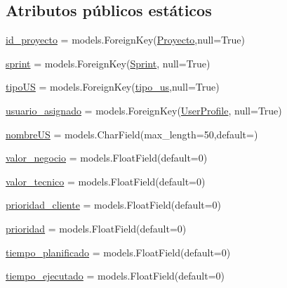 \subsection*{Atributos públicos estáticos}
\begin{DoxyCompactItemize}
\item 
\hyperlink{classuser_story_1_1models_1_1_user_stories_a129b6e2463b6ce9ec3ca204c408303e8}{id\+\_\+proyecto} = models.\+Foreign\+Key(\hyperlink{classproyectos_1_1models_1_1_proyecto}{Proyecto},null=True)
\item 
\hyperlink{classuser_story_1_1models_1_1_user_stories_ab0c43b69bb58a9813846b1ea586a0789}{sprint} = models.\+Foreign\+Key(\hyperlink{class_sprints_1_1models_1_1_sprint}{Sprint}, null=True)
\item 
\hyperlink{classuser_story_1_1models_1_1_user_stories_aef9db53ba498c5fd769c0c6bde3f1b54}{tipo\+US} = models.\+Foreign\+Key(\hyperlink{classtipo_u_s_1_1models_1_1tipo__us}{tipo\+\_\+us},null=True)
\item 
\hyperlink{classuser_story_1_1models_1_1_user_stories_a0ee6ed978e6d77c2b8fb929088734cd5}{usuario\+\_\+asignado} = models.\+Foreign\+Key(\hyperlink{classusuario_1_1models_1_1_user_profile}{User\+Profile}, null=True)
\item 
\hyperlink{classuser_story_1_1models_1_1_user_stories_a01fdc4470aae2e717becedffccd7da3d}{nombre\+US} = models.\+Char\+Field(max\+\_\+length=50,default=\textquotesingle{}\textquotesingle{})
\item 
\hyperlink{classuser_story_1_1models_1_1_user_stories_a5747a9e05af6584278875d718c650c88}{valor\+\_\+negocio} = models.\+Float\+Field(default=0)
\item 
\hyperlink{classuser_story_1_1models_1_1_user_stories_a063c3ed2939ba157b573b974347bab49}{valor\+\_\+tecnico} = models.\+Float\+Field(default=0)
\item 
\hyperlink{classuser_story_1_1models_1_1_user_stories_aa362ec1a6aca862e2e8093758f055c16}{prioridad\+\_\+cliente} = models.\+Float\+Field(default=0)
\item 
\hyperlink{classuser_story_1_1models_1_1_user_stories_a5c49ad7f64583a89297b4bc3efef1acd}{prioridad} = models.\+Float\+Field(default=0)
\item 
\hyperlink{classuser_story_1_1models_1_1_user_stories_a59c31c96525fb97a99df3c82ccefec49}{tiempo\+\_\+planificado} = models.\+Float\+Field(default=0)
\item 
\hyperlink{classuser_story_1_1models_1_1_user_stories_add4c9402f48f9d57b0786e27e4df58ea}{tiempo\+\_\+ejecutado} = models.\+Float\+Field(default=0)

\end{DoxyCompactItemize}
